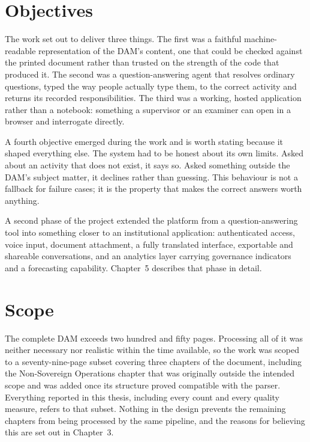 \section*{Objectives}

The work set out to deliver three things. The first was a faithful machine-readable representation of the DAM's content, one that could be checked against the printed document rather than trusted on the strength of the code that produced it. The second was a question-answering agent that resolves ordinary questions, typed the way people actually type them, to the correct activity and returns its recorded responsibilities. The third was a working, hosted application rather than a notebook: something a supervisor or an examiner can open in a browser and interrogate directly.

A fourth objective emerged during the work and is worth stating because it shaped everything else. The system had to be honest about its own limits. Asked about an activity that does not exist, it says so. Asked something outside the DAM's subject matter, it declines rather than guessing. This behaviour is not a fallback for failure cases; it is the property that makes the correct answers worth anything.

A second phase of the project extended the platform from a question-answering tool into something closer to an institutional application: authenticated access, voice input, document attachment, a fully translated interface, exportable and shareable conversations, and an analytics layer carrying governance indicators and a forecasting capability. Chapter~5 describes that phase in detail.

\section*{Scope}

The complete DAM exceeds two hundred and fifty pages. Processing all of it was neither necessary nor realistic within the time available, so the work was scoped to a seventy-nine-page subset covering three chapters of the document, including the Non-Sovereign Operations chapter that was originally outside the intended scope and was added once its structure proved compatible with the parser. Everything reported in this thesis, including every count and every quality measure, refers to that subset. Nothing in the design prevents the remaining chapters from being processed by the same pipeline, and the reasons for believing this are set out in Chapter~3.


